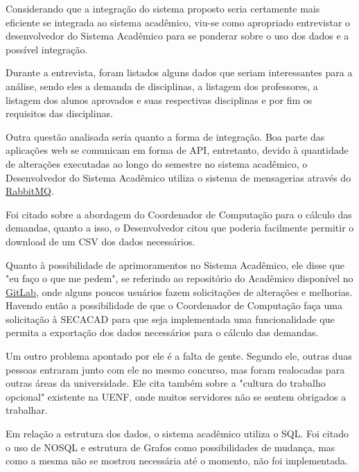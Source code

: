         Considerando que a integração do sistema proposto seria certamente mais eficiente se integrada ao sistema acadêmico, viu-se como apropriado entrevistar o desenvolvedor do Sistema Acadêmico para se ponderar sobre o uso dos dados e a possível integração.

        Durante a entrevista, foram listados alguns dados que seriam interessantes para a análise, sendo eles a demanda de disciplinas, a listagem dos professores, a listagem dos alunos aprovados e suas respectivas disciplinas e por fim os requisitos das disciplinas.


        Outra questão analisada seria quanto a forma de integração. Boa parte das aplicações web se comunicam em forma de API, entretanto, devido à quantidade de alterações executadas ao longo do semestre no sistema acadêmico, o Desenvolvedor do Sistema Acadêmico utiliza o sistema de mensagerias através do \href{https://www.rabbitmq.com/}{RabbitMQ}.

        Foi citado sobre a abordagem do Coordenador de Computação para o cálculo das demandas, quanto a isso, o Desenvolvedor citou que poderia facilmente permitir o download de um CSV dos dados necessários.

        Quanto à possibilidade de aprimoramentos no Sistema Acadêmico, ele disse que "eu faço o que me pedem", se referindo ao repositório do Acadêmico disponível no \href{https://about.gitlab.com/}{GitLab}, onde alguns poucos usuários fazem solicitações de alterações e melhorias. Havendo então a possibilidade de que o Coordenador de Computação faça uma solicitação à SECACAD para que seja implementada uma funcionalidade que permita a exportação dos dados necessários para o cálculo das demandas.

        Um outro problema apontado por ele é a falta de gente. Segundo ele, outras duas pessoas entraram junto com ele no mesmo concurso, mas foram realocadas para outras áreas da universidade. Ele cita também sobre a "cultura do trabalho opcional" existente na UENF, onde muitos servidores não se sentem obrigados a trabalhar.

        Em relação a estrutura dos dados, o sistema acadêmico utiliza o SQL. Foi citado o uso de NOSQL e estrutura de Grafos como possibilidades de mudança, mas como a mesma não se mostrou necessária até o momento, não foi implementada.

